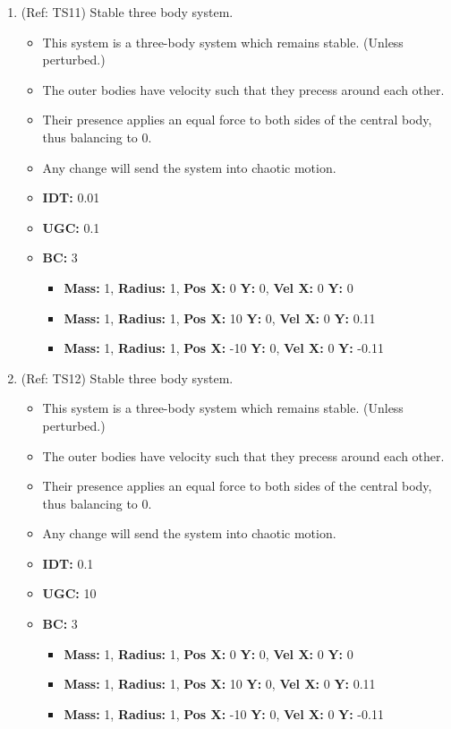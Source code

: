 \begin{enumerate}
\vspace{12pt}  
\item (Ref: TS11) Stable three body system.
  \begin{itemize}
  \item This system is a three-body system which remains stable. (Unless perturbed.)
  \item The outer bodies have velocity such that they precess around each other.
  \item Their presence applies an equal force to both sides of the central body, thus balancing to 0.
  \item Any change will send the system into chaotic motion.
  \item \textbf{IDT:} 0.01
  \item \textbf{UGC:} 0.1 
  \item \textbf{BC:} 3
    \begin{itemize}
    \item \textbf{Mass:} 1, \textbf{Radius:} 1, \textbf{Pos X:} 0 \textbf{Y:} 0, \textbf{Vel X:} 0 \textbf{Y:} 0
    \item \textbf{Mass:} 1, \textbf{Radius:} 1, \textbf{Pos X:} 10 \textbf{Y:} 0, \textbf{Vel X:} 0 \textbf{Y:} 0.11
    \item \textbf{Mass:} 1, \textbf{Radius:} 1, \textbf{Pos X:} -10 \textbf{Y:} 0, \textbf{Vel X:} 0 \textbf{Y:} -0.11
    \end{itemize}
  \end{itemize}
  
\item (Ref: TS12) Stable three body system.
  \begin{itemize}
  \item This system is a three-body system which remains stable. (Unless perturbed.)
  \item The outer bodies have velocity such that they precess around each other.
  \item Their presence applies an equal force to both sides of the central body, thus balancing to 0.
  \item Any change will send the system into chaotic motion.
  \item \textbf{IDT:} 0.1
  \item \textbf{UGC:} 10 
  \item \textbf{BC:} 3
    \begin{itemize}
    \item \textbf{Mass:} 1, \textbf{Radius:} 1, \textbf{Pos X:} 0 \textbf{Y:} 0, \textbf{Vel X:} 0 \textbf{Y:} 0
    \item \textbf{Mass:} 1, \textbf{Radius:} 1, \textbf{Pos X:} 10 \textbf{Y:} 0, \textbf{Vel X:} 0 \textbf{Y:} 0.11
    \item \textbf{Mass:} 1, \textbf{Radius:} 1, \textbf{Pos X:} -10 \textbf{Y:} 0, \textbf{Vel X:} 0 \textbf{Y:} -0.11
    \end{itemize}
  \end{itemize}
\end{enumerate}